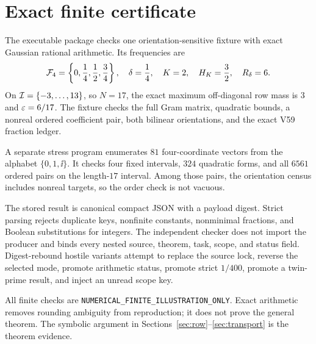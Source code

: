 \section{Exact finite certificate}\label{sec:certificate}

The executable package checks one orientation-sensitive fixture with exact
Gaussian rational arithmetic.  Its frequencies are
\[
\mathcal{F}_4=\left\{0,\frac14,\frac12,\frac34\right\},
\quad \delta=\frac14,
\quad K=2,
\quad H_K=\frac32,
\quad R_{\delta}=6.
\]
\EndAccSupp{}
On $\mathcal{I}=\{-3,\ldots,13\}$, so $N=17$, the exact maximum off-diagonal row
mass is $3$ and $\varepsilon=6/17$.  The fixture checks the full Gram matrix,
quadratic bounds, a nonreal ordered coefficient pair, both bilinear
orientations, and the exact V59 fraction ledger.

A separate stress program enumerates $81$ four-coordinate vectors from the
alphabet $\{0,1,\ii\}$.  It checks four fixed intervals, $324$ quadratic
forms, and all $6561$ ordered pairs on the length-$17$ interval.  Among those
pairs, the orientation census includes nonreal targets, so the order check is
not vacuous.

The stored result is canonical compact JSON with a payload digest.  Strict
parsing rejects duplicate keys, nonfinite constants, nonminimal fractions,
and Boolean substitutions for integers.  The independent checker does not
import the producer and binds every nested source, theorem, task, scope, and
status field.  Digest-rebound hostile variants attempt to replace the source
lock, reverse the selected mode, promote arithmetic status, promote strict
$1/400$, promote a twin-prime result, and inject an unread scope key.

All finite checks are
\texttt{NUMERICAL\_FINITE\_ILLUSTRATION\_ONLY}.  Exact arithmetic removes
rounding ambiguity from reproduction; it does not prove the general theorem.
The symbolic argument in Sections~\ref{sec:row}--\ref{sec:transport} is the
theorem evidence.
